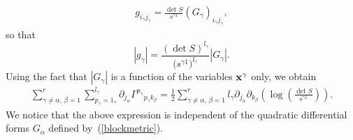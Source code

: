 \documentclass[11pt]{article}
\numberwithin{equation}{section}
\newcommand{\jalpha}{j_{\alpha}}
\newcommand{\kbeta}{k_{\beta}}
\newcommand{\pgamma}{p_{\gamma}}
\newcommand{\igamma}{i_{\gamma}}
\newcommand{\jgamma}{j_{\gamma}}
\newcommand{\lgamma}{l_{\gamma}}
\begin{document}
\begin{gather}\label{Painleveblock}
g_{\igamma \jgamma}=\frac{\det S}{s^{\gamma 1}}(G_{\gamma})_{\igamma \jgamma},
\end{gather}
so that
\[
|g_{\gamma}|=\frac{(\det S)^{\lgamma}}{\big({s^{\gamma 1}}\big)^{\lgamma}}|G_{\gamma}|.
\]
Using the fact that $|G_{\gamma}|$ is a function of the variables ${\bf x}^{\gamma}$ only, we obtain
\begin{gather*}%
\sum_{\gamma \neq \alpha, \,\beta=1}^{r}\sum_{\pgamma=1_{\gamma}}^{\lgamma} \partial_{\jalpha}{\Gamma^{\pgamma}}_{\pgamma \kbeta}=\frac{1}{2}\sum_{\gamma \neq \alpha, \,\beta=1}^{r}\lgamma \partial_{\jalpha}\partial_{\kbeta}\left(\log\left(\frac{\det S}{s^{\gamma 1}}\right)\right).
\end{gather*}
We notice that the above expression is independent of the quadratic differential forms $G_{\alpha}$ defined by~(\ref{blockmetric}).
\end{document}
